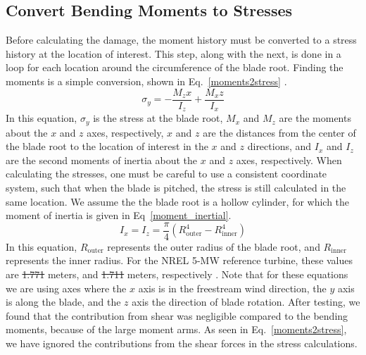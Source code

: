 \documentclass[11pt,letterpaper]{article}
\providecommand{\DIFadd}[1]{{\protect\color{blue}\uwave{#1}}} %
\providecommand{\DIFdel}[1]{{\protect\color{red}\sout{#1}}}                      %
\providecommand{\DIFaddbegin}{} %
\providecommand{\DIFaddend}{} %
\providecommand{\DIFdelbegin}{} %
\providecommand{\DIFdelend}{} %
\newcommand{\DIFscaledelfig}{0.5}
\newlength{\DIFdelgraphicswidth} %
\newlength{\DIFdelgraphicsheight} %
\newcommand{\DIFaddincludegraphics}[2][]{{\color{blue}\fbox{\DIFOincludegraphics[#1]{#2}}}} %
\newcommand{\DIFdelincludegraphics}[2][]{%
\sbox{\DIFdelgraphicsbox}{\DIFOincludegraphics[#1]{#2}}%
\settoboxwidth{\DIFdelgraphicswidth}{\DIFdelgraphicsbox} %
\settoboxtotalheight{\DIFdelgraphicsheight}{\DIFdelgraphicsbox} %
\scalebox{\DIFscaledelfig}{%
\parbox[b]{\DIFdelgraphicswidth}{\usebox{\DIFdelgraphicsbox}\\[-\baselineskip] \rule{\DIFdelgraphicswidth}{0em}}\llap{\resizebox{\DIFdelgraphicswidth}{\DIFdelgraphicsheight}{%
\setlength{\unitlength}{\DIFdelgraphicswidth}%
\begin{picture}(1,1)%
\thicklines\linethickness{2pt} %
{\color[rgb]{1,0,0}\put(0,0){\framebox(1,1){}}}%
{\color[rgb]{1,0,0}\put(0,0){\line( 1,1){1}}}%
{\color[rgb]{1,0,0}\put(0,1){\line(1,-1){1}}}%
\end{picture}%
}\hspace*{3pt}}} %
} %
\DeclareRobustCommand{\DIFaddbegin}{\DIFOaddbegin \let\includegraphics\DIFaddincludegraphics} %
\DeclareRobustCommand{\DIFaddend}{\DIFOaddend \let\includegraphics\DIFOincludegraphics} %
\DeclareRobustCommand{\DIFdelbegin}{\DIFOdelbegin \let\includegraphics\DIFdelincludegraphics} %
\DeclareRobustCommand{\DIFdelend}{\DIFOaddend \let\includegraphics\DIFOincludegraphics} %
\begin{document}
\subsection{Convert Bending Moments to Stresses}
Before calculating the damage, the moment history must be converted to a stress history at the location of interest. This step, along with the next, is done in a loop for each location around the circumference of the blade root. Finding the moments is a simple conversion, shown in Eq.~\ref{moments2stress} \cite{budynas2020shigley}.
% 
\begin{equation}
    \sigma_y = -\frac{M_z x}{I_z} + \frac{M_x z}{I_x}
    \label{moments2stress}
\end{equation}
% 
In this equation, $\sigma_y$ is the stress at the blade root, $M_x$ and $M_z$ are the moments about the $x$ and $z$ axes, respectively, $x$ and $z$ are the distances from the center of the blade root to the location of interest in the $x$ and $z$ directions, and $I_x$ and $I_z$ are the second moments of inertia about the $x$ and $z$ axes, respectively. When calculating the stresses, one must be careful to use a consistent coordinate system, such that when the blade is pitched, the stress is still calculated in the same location. We assume the the blade root is a hollow cylinder, for which the moment of inertia is given in Eq~\ref{moment_inertial}.
% 
\begin{equation}
    I_x = I_z = \frac{\pi}{4} (R_\text{outer}^4 - R_\text{inner}^4)
    \label{moment_inertial}
\end{equation}
% 
In this equation, $R_\text{outer}$ represents the outer radius of the blade root, and $R_\text{inner}$ represents the inner radius. For the NREL 5-MW reference turbine, these values are \DIFdelbegin \DIFdel{1.771 }\DIFdelend \DIFaddbegin \DIFadd{1.693 }\DIFaddend meters, and \DIFdelbegin \DIFdel{1.711 }\DIFdelend \DIFaddbegin \DIFadd{1.643 }\DIFaddend meters, respectively \DIFaddbegin \DIFadd{\mbox{%
\cite{resor2013definition}}\hspace{0pt}%
}\DIFaddend . Note that for these equations we are using axes where the $x$ axis is in the freestream wind direction, the $y$ axis is along the blade, and the $z$ axis the direction of blade rotation. After testing, we found that the contribution from shear was negligible compared to the bending moments, because of the large moment arms. As seen in Eq.~\ref{moments2stress}, we have ignored the contributions from the shear forces in the stress calculations. 
\end{document}
